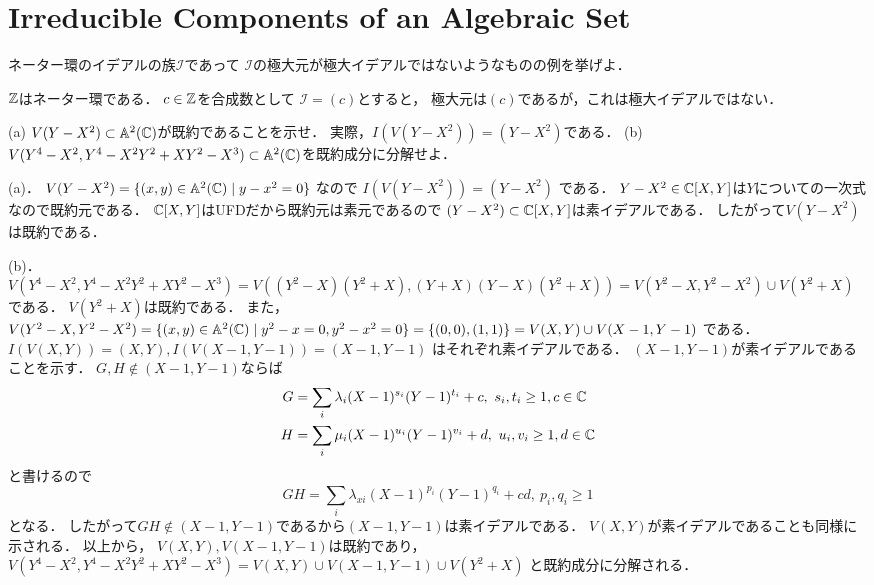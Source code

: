 \section{Irreducible Components of an Algebraic Set}

\begin{prob}
  ネーター環のイデアルの族$\mathcal{I}$であって
  $\mathcal{I}$の極大元が極大イデアルではないようなものの例を挙げよ．
\end{prob}
\begin{ans}
  $\mathbb{Z}$はネーター環である．
  $c \in \mathbb{Z}$を合成数として
  $\mathcal{I} = (c)$とすると，
  極大元は$(c)$であるが，これは極大イデアルではない．
\end{ans}

\begin{prob}
  (a) $V(Y-X^2) \subset \mathbb{A}^2(\mathbb{C})$が既約であることを示せ．
  実際，$I(V(Y-X^2)) = (Y-X^2)$である．
  (b) $V(Y^4-X^2, Y^4 - X^2Y^2 + XY^2 - X^3) \subset \mathbb{A}^2(\mathbb{C})$を既約成分に分解せよ．
\end{prob}
\begin{ans}
  (a)．
  $V(Y-X^2) = \{ (x,y) \in \mathbb{A}^2(\mathbb{C}) \mid y-x^2 = 0 \}$
  なので
  $I(V(Y-X^2)) = (Y-X^2)$
  である．
  $Y-X^2 \in \mathbb{C}[X,Y]$は$Y$についての一次式なので既約元である．
  $\mathbb{C}[X,Y]$はUFDだから既約元は素元であるので
  $(Y-X^2) \subset \mathbb{C}[X,Y]$は素イデアルである．
  したがって$V(Y-X^2)$は既約である．
  
  (b)．
  $V(Y^4-X^2, Y^4 - X^2Y^2 + XY^2 - X^3) = V( (Y^2-X)(Y^2+X), (Y+X)(Y-X)(Y^2+X) )
  = V( Y^2-X, Y^2-X^2 ) \cup V( Y^2+X ) $
  である．
  $V(Y^2 + X)$は既約である．
  また，
  $ V( Y^2-X, Y^2-X^2 ) = \{ (x,y) \in \mathbb{A}^2(\mathbb{C}) \mid y^2-x=0, y^2-x^2=0 \}
  = \{ (0,0), (1,1) \} = V(X,Y) \cup V(X-1,Y-1) $
  である．
  $I(V(X,Y)) = (X,Y), I(V(X-1,Y-1)) = (X-1,Y-1)$
  はそれぞれ素イデアルである．
  $(X-1,Y-1)$が素イデアルであることを示す．
  $ G, H \not \in (X-1,Y-1) $ならば
  \[ \begin{split}
    G &= \sum_{i} \lambda_{i} (X-1)^{s_i}(Y-1)^{t_i} + c, \ s_i,t_i \ge 1, c \in \mathbb{C} \\
    H &= \sum_{i} \mu_{i}     (X-1)^{u_i}(Y-1)^{v_i} + d, \ u_i,v_i \ge 1, d \in \mathbb{C}
  \end{split} \]
  と書けるので
  \[ GH = \sum_{i} \lambda_{xi} (X-1)^{p_i}(Y-1)^{q_i} + cd, \ p_i,q_i \ge 1 \]
  となる．
  したがって$GH \not \in (X-1,Y-1)$であるから$(X-1,Y-1)$は素イデアルである．
  $V(X,Y)$が素イデアルであることも同様に示される．
  以上から，
  $V(X,Y), V(X-1,Y-1) $は既約であり，
  $V(Y^4-X^2, Y^4 - X^2Y^2 + XY^2 - X^3) = V(X,Y) \cup V(X-1,Y-1) \cup V( Y^2+X ) $
  と既約成分に分解される．
\end{ans}
